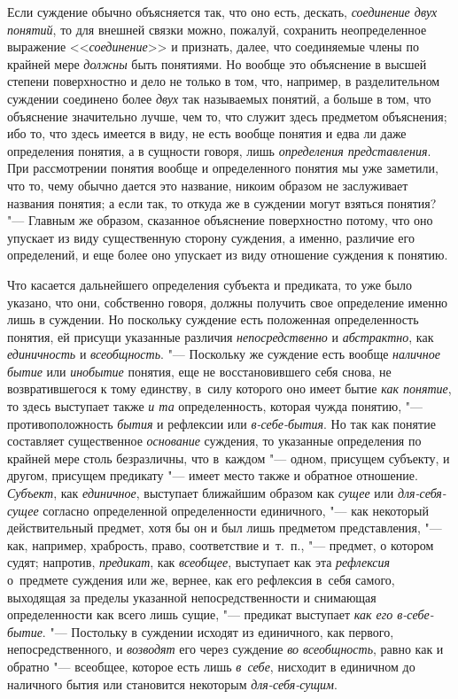 Если суждение обычно объясняется так, что оно есть, дескать,
{\em соединение двух понятий}, то для внешней связки можно, пожалуй, сохранить
неопределенное выражение <<{\em соединение}>> и признать, далее, что
соединяемые члены по крайней мере {\em должны} быть понятиями. Но вообще это
объяснение в высшей степени поверхностно и дело не только в том, что, например,
в разделительном суждении соединено более {\em двух} так называемых
понятий, а больше в том, что объяснение значительно лучше, чем то, что
служит здесь предметом объяснения; ибо то, что здесь имеется в виду, не
есть вообще понятия и едва ли даже определения понятия, а в сущности говоря,
лишь {\em определения представления}. При рассмотрении понятия вообще и
определенного понятия мы уже заметили, что то, чему обычно дается это
название, никоим образом не заслуживает названия понятия; а если так, то
откуда же в суждении могут взяться понятия? "--- Главным же
образом, сказанное объяснение поверхностно потому, что оно упускает из виду
существенную сторону суждения, а именно, различие его определений, и еще
более оно упускает из виду отношение суждения к понятию.

Что касается дальнейшего определения субъекта и предиката, то
уже было указано, что они, собственно говоря, должны получить свое
определение именно лишь в суждении. Но поскольку суждение есть положенная
определенность понятия, ей присущи указанные различия
{\em непосредственно} и {\em абстрактно}, как {\em единичность}
и {\em всеобщность}. "--- Поскольку же суждение есть вообще
{\em наличное бытие} или {\em инобытие} понятия, еще не восстановившего себя
снова, не возвратившегося к тому единству, в~силу которого оно имеет бытие
{\em как понятие}, то здесь выступает также {\em и та} определенность, которая
чужда понятию, "--- противоположность {\em бытия} и рефлексии или
{\em в-себе-бытия}. Но так как понятие составляет существенное {\em основание}
суждения, то указанные определения по крайней мере столь безразличны, что
в~каждом "--- одном, присущем субъекту, и другом, присущем предикату "---
имеет место также и обратное отношение. {\em Субъект}, как {\em единичное},
выступает ближайшим образом как {\em сущее} или {\em для-себя-сущее}
согласно определенной определенности единичного, "---
как некоторый действительный предмет, хотя бы он и был лишь
предметом представления, "--- как, например, храбрость, право,
соответствие и~т.~п., "--- предмет, о котором судят; напротив,
{\em предикат}, как {\em всеобщее}, выступает как эта {\em рефлексия}
о~предмете суждения или же, вернее, как его рефлексия в~себя самого,
выходящая за пределы указанной непосредственности и снимающая определенности
как всего лишь сущие, "--- предикат выступает {\em как его в-себе-бытие}. "---
Постольку в суждении исходят из единичного, как первого, непосредственного, и
{\em возводят} его через суждение {\em во всеобщность}, равно как и обратно
"--- всеобщее, которое есть лишь {\em в~себе}, нисходит в единичном до
наличного бытия или становится некоторым {\em для-себя-сущим}.

